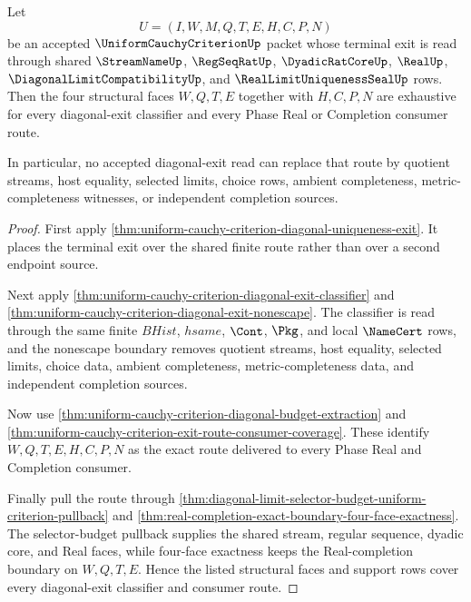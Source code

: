 \begin{theorem}
\label{thm:uniform-cauchy-criterion-diagonal-structural-face-coverage}
Let
$$
U=(I,W,M,Q,T,E,H,C,P,N)
$$
be an accepted $\UniformCauchyCriterionUp$ packet whose terminal exit is read through shared $\StreamNameUp$, $\RegSeqRatUp$, $\DyadicRatCoreUp$, $\RealUp$, $\DiagonalLimitCompatibilityUp$, and $\RealLimitUniquenessSealUp$ rows. Then the four structural faces $W,Q,T,E$ together with $H,C,P,N$ are exhaustive for every diagonal-exit classifier and every Phase Real or Completion consumer route.

In particular, no accepted diagonal-exit read can replace that route by quotient streams, host equality, selected limits, choice rows, ambient completeness, metric-completeness witnesses, or independent completion sources.
\end{theorem}
\begin{proof}
First apply \autoref{thm:uniform-cauchy-criterion-diagonal-uniqueness-exit}. It places the terminal exit over the shared finite route rather than over a second endpoint source.

Next apply \autoref{thm:uniform-cauchy-criterion-diagonal-exit-classifier} and \autoref{thm:uniform-cauchy-criterion-diagonal-exit-nonescape}. The classifier is read through the same finite $BHist$, $hsame$, $\Cont$, $\Pkg$, and local $\NameCert$ rows, and the nonescape boundary removes quotient streams, host equality, selected limits, choice data, ambient completeness, metric-completeness data, and independent completion sources.

Now use \autoref{thm:uniform-cauchy-criterion-diagonal-budget-extraction} and \autoref{thm:uniform-cauchy-criterion-exit-route-consumer-coverage}. These identify $W,Q,T,E,H,C,P,N$ as the exact route delivered to every Phase Real and Completion consumer.

Finally pull the route through \autoref{thm:diagonal-limit-selector-budget-uniform-criterion-pullback} and \autoref{thm:real-completion-exact-boundary-four-face-exactness}. The selector-budget pullback supplies the shared stream, regular sequence, dyadic core, and Real faces, while four-face exactness keeps the Real-completion boundary on $W,Q,T,E$. Hence the listed structural faces and support rows cover every diagonal-exit classifier and consumer route.
\end{proof}

